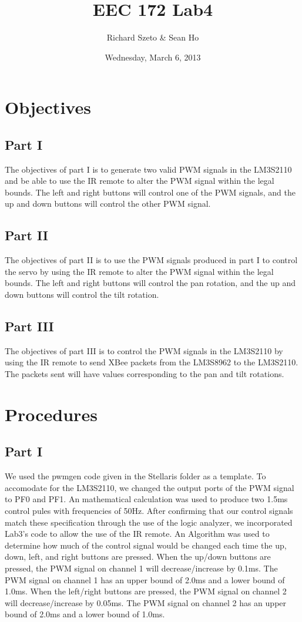 \documentclass[11pt, titlepage]{article}
\title{EEC 172 Lab4}
\author{Richard Szeto \& Sean Ho}
\date{Wednesday, March 6, 2013}
\begin{document}
    \maketitle
    
    \section{Objectives}
        \subsection{Part I}
            The objectives of part I is to generate two valid PWM signals in the LM3S2110 and be able to use the IR remote to alter the PWM signal within the legal bounds. The left and right buttons will control one of the PWM signals, and the up and down buttons will control the other PWM signal.
        \subsection{Part II}
            The objectives of part II is to use the PWM signals produced in part I to control the servo by using the IR remote to alter the PWM signal within the legal bounds. The left and right buttons will control the pan rotation, and the up and down buttons will control the tilt rotation.
        \subsection{Part III}
            The objectives of part III is to control the PWM signals in the LM3S2110 by using the IR remote to send XBee packets from the LM3S8962 to the LM3S2110. The packets sent will have values corresponding to the pan and tilt rotations.
    \section{Procedures}
        \subsection{Part I}
            We used the pwmgen code given in the Stellaris folder as a template. To accomodate for the LM3S2110, we changed the output ports of the PWM signal to PF0 and PF1. An mathematical calculation was used to produce two 1.5ms control pules with frequencies of 50Hz. After confirming that our control signals match these specification through the use of the logic analyzer, we incorporated Lab3's code to allow the use of the IR remote. An Algorithm was used to determine how much of the control signal would be changed each time the up, down, left, and right buttons are pressed. When the up/down buttons are pressed, the PWM signal on channel 1 will decrease/increase by 0.1ms. The PWM signal on channel 1 has an upper bound of 2.0ms and a lower bound of 1.0ms. When the left/right buttons are pressed, the PWM signal on channel 2 will decrease/increase by 0.05ms. The PWM signal on channel 2 has an upper bound of 2.0ms and a lower bound of 1.0ms.
\end{document}

